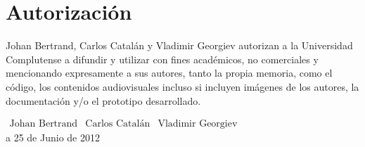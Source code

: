 \chapter*{Autorización}

Johan Bertrand, Carlos Catalán y Vladimir Georgiev autorizan a la Universidad Complutense a difundir y utilizar con fines académicos, no comerciales y mencionando expresamente a sus autores, tanto la propia memoria, como el código, los contenidos audiovisuales incluso si incluyen imágenes de los autores, la documentación y/o el prototipo desarrollado.\\
\begin{center}
	\vspace{2.5in}

	\large

	
	$\begin{array}{ccc}
		\text{Johan Bertrand} & \text{Carlos Catalán} & \text{Vladimir Georgiev}
	\end{array}$\\
	\vspace{0.4in} a 25 de Junio de 2012
\end{center}

\normalsize


